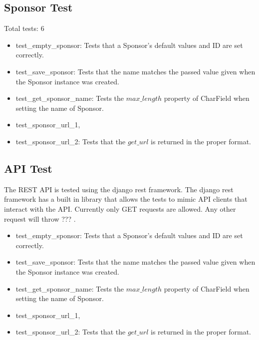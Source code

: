 \documentclass[12pt,english]{scrartcl}
\begin{document}
\subsection{Sponsor Test} 
Total tests: 6
\begin{itemize}
\item test\_empty\_sponsor: Tests that a Sponsor's default values and ID are set correctly.
 
\item test\_save\_sponsor: Tests that the name matches the passed value given when the Sponsor instance was created.  
 
\item test\_get\_sponsor\_name: Tests the $max\_length$ property of CharField when setting the name of Sponsor.

\item test\_sponsor\_url\_1, \item test\_sponsor\_url\_2: Tests that the $get\_url$ is returned in the proper format.
\end{itemize}


\subsection{API Test} 
The REST API is tested using the django rest framework. The django rest framework has a built in library that allows the tests to mimic API clients that interact with the API.
Currently only GET requests are allowed. Any other request will throw ??? .
\begin{itemize}
\item test\_empty\_sponsor: Tests that a Sponsor's default values and ID are set correctly.
 
\item test\_save\_sponsor: Tests that the name matches the passed value given when the Sponsor instance was created.  
 
\item test\_get\_sponsor\_name: Tests the $max\_length$ property of CharField when setting the name of Sponsor.

\item test\_sponsor\_url\_1, \item test\_sponsor\_url\_2: Tests that the $get\_url$ is returned in the proper format.
\end{itemize}
\end{document}
